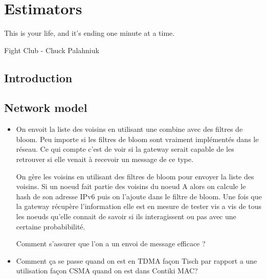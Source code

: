 \chapter{Estimators} %
\label{cha:estimators}

\epigraph{This is your life, and it's ending one minute at a time.}{Fight Club - Chuck Palahniuk}

\minitoc

\section{Introduction} %
\label{sec:estimators_introduction}

\lipsum


\section{Network model} %
\label{sec:estimators_network_model}

\lipsum

\begin{itemize}

    \item On envoit la liste des voisins en utilisant une combine avec des
      filtres de bloom. Peu importe si les filtres de bloom sont vraiment
      implémentés dans le réseau. Ce qui compte c'est de voir si la gateway
      serait capable de les retrouver si elle venait à recevoir un message de
      ce type.

      On gère les voisins en utilisant des filtres de bloom pour envoyer la
      liste des voisins. Si un noeud fait partie des voisins du noeud A alors
      on calcule le hash de son adresse IPv6 puis on l'ajoute dans le filtre
      de bloom. Une fois que la gateway récupère l'information elle est en
      mesure de tester vis a vis de tous les noeuds qu'elle connait de savoir
      si ils interagissent ou pas avec une certaine probabibilité.

      Comment s'assurer que l'on a un envoi de message efficace ?

      \item Comment ça se passe quand on est en TDMA façon Tisch par rapport
      a une utilisation façon CSMA quand on est dans Contiki MAC?

\end{itemize}


